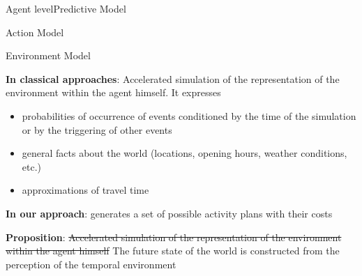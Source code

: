 \begin{frame}{Agent level}{Predictive Model}
\begin{block}{Action Model}
\end{block}
\begin{block}{Environment Model}
\par \textbf{In classical approaches}: Accelerated simulation of the representation of the environment within the agent himself. It expresses
\begin{itemize}
    \item probabilities of occurrence of events conditioned by the time of the simulation or by the triggering of other events
    \item general facts about the world (locations, opening hours, weather conditions, etc.)
    \item approximations of travel time
\end{itemize}
\medbreak
\par \textbf{In our approach}: generates a set of possible activity plans with their costs
\vspace{.5cm}
\par \textbf{Proposition}: \st{Accelerated simulation of the representation of the environment within the agent himself}
\medbreak
The future state of the world is constructed from the perception of the temporal environment

\end{block}


\end{frame}
